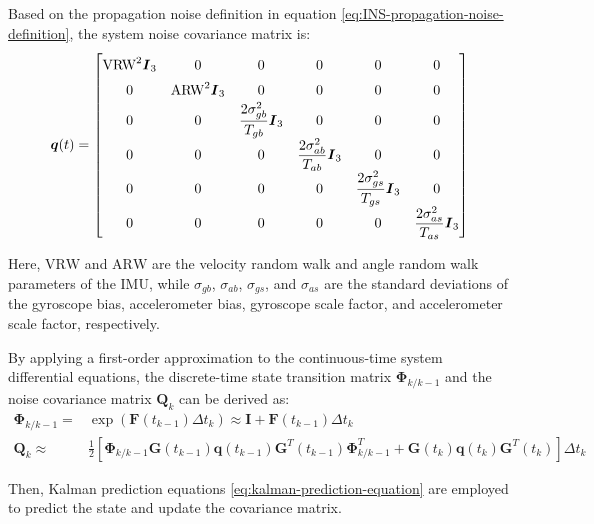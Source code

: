 \documentclass{article}
\begin{document}
Based on the propagation noise definition in equation \eqref{eq:INS-propagation-noise-definition}, the system noise covariance matrix is:
\begin{equation}
    {\boldsymbol{q}}{(t)}=\left[ \begin{matrix}
        \renewcommand{\arraystretch}{1.5}
        \text{VRW}^2\boldsymbol{I}_3&		0&		0&		0&		0&		0\\
        0&		\text{ARW}^2\boldsymbol{I}_3&		0&		0&		0&		0\\
        0&		0&		\dfrac{2\sigma _{{gb}}^{2}}{{T}_{{gb}}}\boldsymbol{I}_3&		0&		0&		0\\
        0&		0&		0&		\dfrac{2\sigma _{{ab}}^{2}}{{T}_{{ab}}}\boldsymbol{I}_3&		0&		0\\
        0&		0&		0&		0&		\dfrac{2\sigma _{{gs}}^{2}}{{T}_{{gs}}}\boldsymbol{I}_3&		0\\
        0&		0&		0&		0&		0&		\dfrac{2\sigma _{{as}}^{2}}{{T}_{{as}}}\boldsymbol{I}_3\\
    \end{matrix} \right] 
\end{equation}

Here, $\text{VRW}$ and $\text{ARW}$ are the velocity random walk and angle random walk parameters of the IMU, while $\sigma _{gb}$, $\sigma _{ab}$, $\sigma _{gs}$, and $\sigma _{as}$ are the standard deviations of the gyroscope bias, accelerometer bias, gyroscope scale factor, and accelerometer scale factor, respectively.

By applying a first-order approximation to the continuous-time system differential equations, the discrete-time state transition matrix $\boldsymbol{\Phi}_{k/k-1}$ and the noise covariance matrix $\boldsymbol{Q}_{k}$ can be derived as:
\begin{equation}
    \begin{aligned}
        \boldsymbol{\Phi}_{k/k-1} =& \exp\left( \boldsymbol{F}({t_{k-1}})\Delta t_k \right) \approx \boldsymbol{I} + \boldsymbol{F}({t_{k-1}})\Delta t_k\\
        \boldsymbol{Q}_{k} \approx& \frac{1}{2}\left[ \boldsymbol{\Phi }_{{k}/{k}-1}\boldsymbol{G}({t}_{{k}-1})\boldsymbol{q}({t}_{{k}-1})\boldsymbol{G}^{{T}}({t}_{{k}-1})\boldsymbol{\Phi}_{{k}/{k}-1}^{{T}}+\boldsymbol{G}({t}_{k}) \boldsymbol{q}({t}_{{k}})\boldsymbol{G}^{{T}}({t}_{{k}}) \right] \Delta t_k
    \end{aligned}
\end{equation}

Then, Kalman prediction equations \eqref{eq:kalman-prediction-equation} are employed to predict the state and update the covariance matrix.
\end{document}
